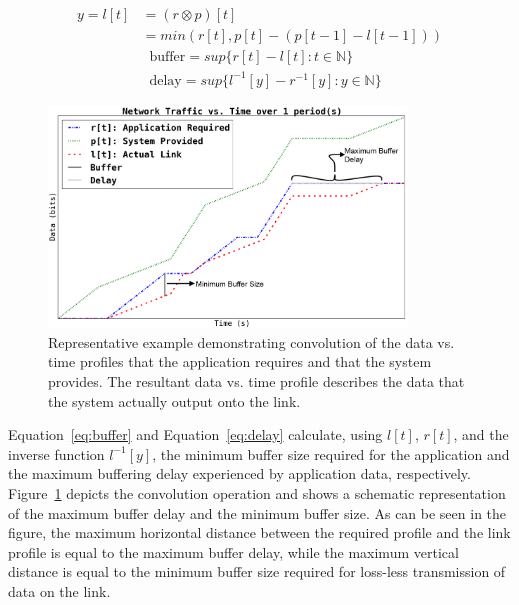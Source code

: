 \begin{equation}
	\label{eq:convolution}
	\begin{split}
		y=l[t] &= (r \otimes p)[t] \\ &= min( r[t] , p[t] -
                (p[t-1] - l[t-1]) )
	\end{split}
\end{equation}
\vspace{-0.5in}
\begin{align}
	\label{eq:buffer}
	&\text{buffer}= sup\{r[t] - l[t] : t \in \mathbb{N}\}\\
	\label{eq:delay}
	&\text{delay} = sup\{l^{-1}[y]-r^{-1}[y] : y \in \mathbb{N}\}
\end{align}

\begin{figure}[h!]
	\centering
        \includegraphics[width=0.85\textwidth]{figs/convolution6.png}
	\caption{Representative example demonstrating convolution of
          the data vs. time profiles that the application requires and
          that the system provides.  The resultant data vs. time
          profile describes the data that the system actually
          output onto the link.}
	\label{fig:convolution}
\end{figure}

Equation~\ref{eq:buffer} and Equation~\ref{eq:delay} calculate, using
$l[t]$, $r[t]$, and the inverse function $l^{-1}[y]$, the minimum
buffer size required for the application and the maximum buffering
delay experienced by application data, respectively.
Figure~\ref{fig:convolution} depicts the convolution operation and
shows a schematic representation of the maximum buffer delay and the
minimum buffer size.  As can be seen in the figure, the maximum
horizontal distance between the required profile and the link profile
is equal to the maximum buffer delay, while the maximum vertical
distance is equal to the minimum buffer size required for loss-less
transmission of data on the link.

